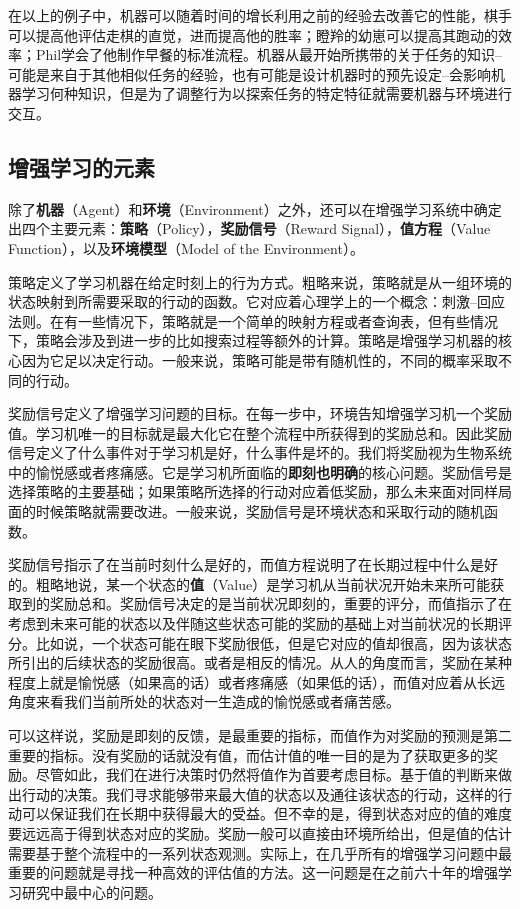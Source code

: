 \documentclass{ctexart}
\begin{document}
            在以上的例子中，机器可以随着时间的增长利用之前的经验去改善它的性能，棋手可以提高他评估走棋的直觉，进而提高他的胜率；瞪羚的幼崽可以提高其跑动的效率；Phil学会了他制作早餐的标准流程。机器从最开始所携带的关于任务的知识--可能是来自于其他相似任务的经验，也有可能是设计机器时的预先设定--会影响机器学习何种知识，但是为了调整行为以探索任务的特定特征就需要机器与环境进行交互。

        \subsection{增强学习的元素}
            除了\textbf{机器}（Agent）和\textbf{环境}（Environment）之外，还可以在增强学习系统中确定出四个主要元素：\textbf{策略}（Policy），\textbf{奖励信号}（Reward Signal），\textbf{值方程}（Value Function），以及\textbf{环境模型}（Model of the Environment）。

            策略定义了学习机器在给定时刻上的行为方式。粗略来说，策略就是从一组环境的状态映射到所需要采取的行动的函数。它对应着心理学上的一个概念：刺激--回应法则。在有一些情况下，策略就是一个简单的映射方程或者查询表，但有些情况下，策略会涉及到进一步的比如搜索过程等额外的计算。策略是增强学习机器的核心因为它足以决定行动。一般来说，策略可能是带有随机性的，不同的概率采取不同的行动。

            奖励信号定义了增强学习问题的目标。在每一步中，环境告知增强学习机一个奖励值。学习机唯一的目标就是最大化它在整个流程中所获得到的奖励总和。因此奖励信号定义了什么事件对于学习机是好，什么事件是坏的。我们将奖励视为生物系统中的愉悦感或者疼痛感。它是学习机所面临的\textbf{即刻也明确}的核心问题。奖励信号是选择策略的主要基础；如果策略所选择的行动对应着低奖励，那么未来面对同样局面的时候策略就需要改进。一般来说，奖励信号是环境状态和采取行动的随机函数。

            奖励信号指示了在当前时刻什么是好的，而值方程说明了在长期过程中什么是好的。粗略地说，某一个状态的\textbf{值}（Value）是学习机从当前状况开始未来所可能获取到的奖励总和。奖励信号决定的是当前状况即刻的，重要的评分，而值指示了在考虑到未来可能的状态以及伴随这些状态可能的奖励的基础上对当前状况的长期评分。比如说，一个状态可能在眼下奖励很低，但是它对应的值却很高，因为该状态所引出的后续状态的奖励很高。或者是相反的情况。从人的角度而言，奖励在某种程度上就是愉悦感（如果高的话）或者疼痛感（如果低的话），而值对应着从长远角度来看我们当前所处的状态对一生造成的愉悦感或者痛苦感。

            可以这样说，奖励是即刻的反馈，是最重要的指标，而值作为对奖励的预测是第二重要的指标。没有奖励的话就没有值，而估计值的唯一目的是为了获取更多的奖励。尽管如此，我们在进行决策时仍然将值作为首要考虑目标。基于值的判断来做出行动的决策。我们寻求能够带来最大值的状态以及通往该状态的行动，这样的行动可以保证我们在长期中获得最大的受益。但不幸的是，得到状态对应的值的难度要远远高于得到状态对应的奖励。奖励一般可以直接由环境所给出，但是值的估计需要基于整个流程中的一系列状态观测。实际上，在几乎所有的增强学习问题中最重要的问题就是寻找一种高效的评估值的方法。这一问题是在之前六十年的增强学习研究中最中心的问题。
\end{document}
